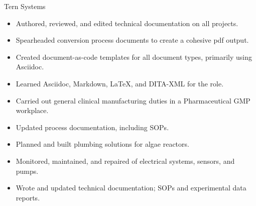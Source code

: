 \documentclass[11pt,oneside,a4paper,titlepage]{article}
\begin{document}
{\begin{minipage}{11.3cm}
        \vspace*{0.12cm}
    
        {Tern Systems}
        {\begin{itemize} \scriptsize
            \item Authored, reviewed, and edited technical documentation on all projects.
            \item Spearheaded conversion process documents to create a cohesive pdf output.
            \item Created document-as-code templates for all  document types, primarily using Asciidoc.
            \item Learned Asciidoc, Markdown, LaTeX, and DITA-XML for the role. 
        \end{itemize}}  
        
        \vspace*{0.12cm}
            
        {\begin{itemize} \scriptsize
            \item Carried out general clinical manufacturing duties in a Pharmaceutical GMP workplace. 
            \item Updated process documentation, including SOPs.
        \end{itemize}}
        
        \vspace*{0.12cm}
        
        {\begin{itemize} \scriptsize
            \item Planned and built plumbing solutions for algae reactors. 
            \item Monitored, maintained, and repaired of electrical systems, sensors, and pumps. 
            \item Wrote and updated technical documentation; SOPs and experimental data reports.
        \end{itemize}}
    \end{minipage}} %
\end{document}
